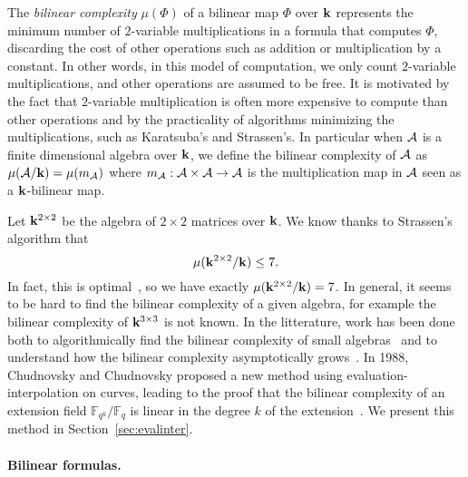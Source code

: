 The \emph{bilinear complexity} $\mu(\Phi)$ of a bilinear map $\Phi$ over $\mathbf{k}$
represents the minimum number of $2$-variable
multiplications in a formula that computes $\Phi$, discarding the cost of other
operations such as addition or multiplication by a constant. In other words, in
this model of computation, we only count $2$-variable multiplications, and other
operations are assumed to be free. It is motivated by the fact that
$2$-variable multiplication is often more expensive to compute than other
operations and by the practicality of algorithms minimizing the multiplications,
such as Karatsuba's and Strassen's.
In particular when $\mathcal{A}$ is a finite dimensional algebra over $\mathbf{k}$,
we define the bilinear complexity of $\mathcal{A}$ as $\mu(\mathcal{A}/\mathbf{k})=\mu(m_{\mathcal{A}})$
where $m_{\mathcal{A}}:\mathcal{A}\times\mathcal{A}\to\mathcal{A}$ is the multiplication map in $\mathcal{A}$ seen
as a $\mathbf{k}$-bilinear map.

Let $\mathbf{k}^{2\times2}$ be the algebra
of $2\times2$ matrices over $\mathbf{k}$. We know thanks to Strassen's algorithm that
\[
  \mu(\mathbf{k}^{2\times 2}/\mathbf{k}) \leq 7.
\]
In fact, this is optimal~\cite[Theorem 3.1]{Winograd71}, so we have exactly $\mu(\mathbf{k}^{2\times2}/\mathbf{k})=7$. In
general, it seems to be hard to find the bilinear complexity of a given algebra,
for example the bilinear complexity of $\mathbf{k}^{3\times3}$ is not known.
In the litterature, work has been done both to algorithmically find the bilinear complexity of
small algebras~\cite{BDEZ12, Covanov19} and to understand how the bilinear
complexity asymptotically grows~\cite{CC88, BCPRRR21}. In 1988, Chudnovsky and Chudnovsky
proposed a new method using evaluation-interpolation on curves, leading to the
proof that the bilinear complexity of an extension field
$\mathbb{F}_{q^k}/\mathbb{F}_{q}$ is linear in the degree $k$ of the
extension~\cite{Ballet99}. We present this method in Section~\ref{sec:evalinter}.

\paragraph{Bilinear formulas.}

